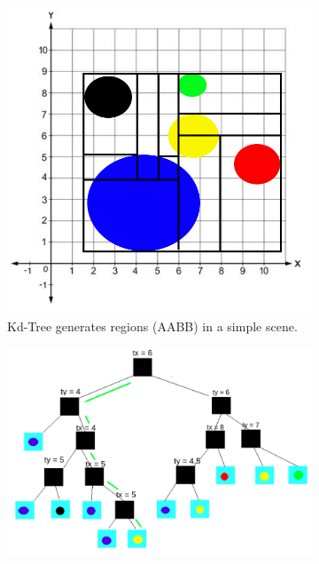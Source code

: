 \documentclass[11pt,a4paper]{article}
\begin{document}
\begin{figure}[H]	
     \centering
     \begin{subfigure}[b]{0.3\textwidth}
         \centering
         \includegraphics[width=\textwidth]{images/kdtree/visaul_scene_1.png}
         \caption{Kd-Tree generates regions (AABB) in a simple scene.}
         \label{fig:pi_4000}
     \end{subfigure}
     \hfill
     \begin{subfigure}[b]{0.6\textwidth}
         \centering
         \includegraphics[width=\textwidth]{images/kdtree/visaul_tree_11_green.png}

\end{subfigure}
\end{figure}
\end{document}
